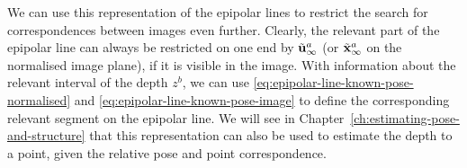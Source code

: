 We can use this representation of the epipolar lines to restrict the search for correspondences between images even further.
Clearly, the relevant part of the epipolar line can always be restricted on one end by $\tilde{{\boldsymbol{\mathbf{u}}}}^a_{\infty}$ (or $\tilde{{\boldsymbol{\mathbf{x}}}}^a_{\infty}$ on the normalised image plane), if it is visible in the image.
With information about the relevant interval of the depth $z^b$, we can use \eqref{eq:epipolar-line-known-pose-normalised} and \eqref{eq:epipolar-line-known-pose-image} to define the corresponding relevant segment on the epipolar line.
We will see in Chapter~\ref{ch:estimating-pose-and-structure} that this representation can also be used to estimate the depth to a point, given the relative pose and point correspondence.

